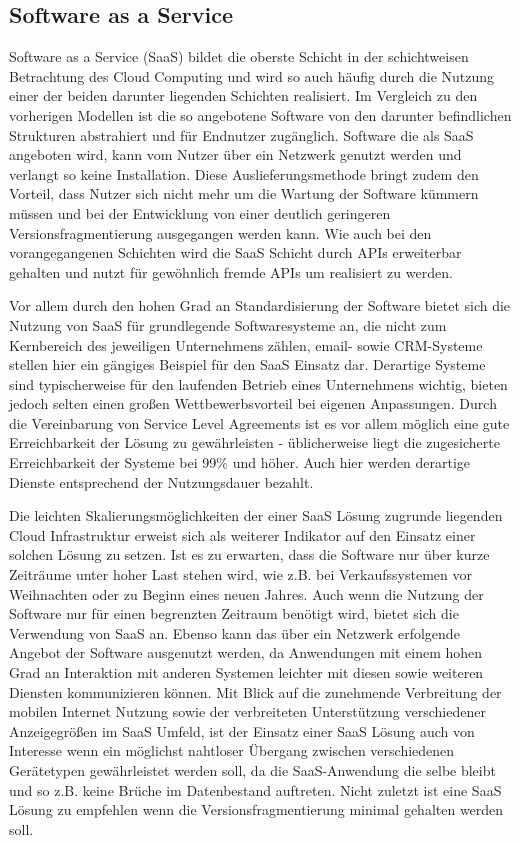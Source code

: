 \documentclass[journal]{IEEEtran}
\begin{document}
\subsection{Software as a Service}
Software as a Service (SaaS) bildet die oberste Schicht in der schichtweisen Betrachtung des Cloud Computing und wird so auch häufig durch die Nutzung einer der beiden darunter liegenden Schichten realisiert. Im Vergleich zu den vorherigen Modellen ist die so angebotene Software von den darunter befindlichen Strukturen abstrahiert und für Endnutzer zugänglich. Software die als SaaS angeboten wird, kann vom Nutzer über ein Netzwerk genutzt werden und verlangt so keine Installation. Diese Auslieferungsmethode bringt zudem den Vorteil, dass Nutzer sich nicht mehr um die Wartung der Software kümmern müssen und bei der Entwicklung von einer deutlich geringeren Versionsfragmentierung ausgegangen werden kann. Wie auch bei den vorangegangenen Schichten wird die SaaS Schicht durch APIs erweiterbar gehalten und nutzt für gewöhnlich fremde APIs um realisiert zu werden.

Vor allem durch den hohen Grad an Standardisierung der Software bietet sich die Nutzung von SaaS für grundlegende Softwaresysteme an, die nicht zum Kernbereich des jeweiligen Unternehmens zählen, email- sowie CRM-Systeme stellen hier ein gängiges Beispiel für den SaaS Einsatz dar. Derartige Systeme sind typischerweise für den laufenden Betrieb eines Unternehmens wichtig, bieten jedoch selten einen großen Wettbewerbsvorteil bei eigenen Anpassungen. Durch die Vereinbarung von Service Level Agreements ist es vor allem möglich eine gute Erreichbarkeit der Lösung zu gewährleisten - üblicherweise liegt die zugesicherte Erreichbarkeit der Systeme bei 99\% und höher. Auch hier werden derartige Dienste entsprechend der Nutzungsdauer bezahlt.

Die leichten Skalierungsmöglichkeiten der einer SaaS Lösung zugrunde liegenden Cloud Infrastruktur erweist sich als weiterer Indikator auf den Einsatz einer solchen Lösung zu setzen. Ist es zu erwarten, dass die Software nur über kurze Zeiträume unter hoher Last stehen wird, wie z.B. bei Verkaufssystemen vor Weihnachten oder zu Beginn eines neuen Jahres. Auch wenn die Nutzung der Software nur für einen begrenzten Zeitraum benötigt wird, bietet sich die Verwendung von SaaS an. Ebenso kann das über ein Netzwerk erfolgende Angebot der Software ausgenutzt werden, da Anwendungen mit einem hohen Grad an Interaktion mit anderen Systemen leichter mit diesen sowie weiteren Diensten kommunizieren können. Mit Blick auf die zunehmende Verbreitung der mobilen Internet Nutzung sowie der verbreiteten Unterstützung verschiedener Anzeigegrößen im SaaS Umfeld, ist der Einsatz einer SaaS Lösung auch von Interesse wenn ein möglichst nahtloser Übergang zwischen verschiedenen Gerätetypen gewährleistet werden soll, da die SaaS-Anwendung die selbe bleibt und so z.B. keine Brüche im Datenbestand auftreten. Nicht zuletzt ist eine SaaS Lösung zu empfehlen wenn die Versionsfragmentierung minimal gehalten werden soll.
\end{document}
